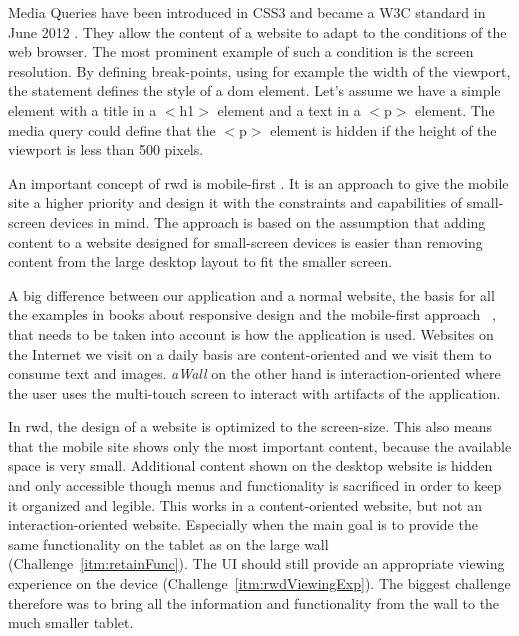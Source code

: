 \documentclass{sigchi}
\begin{document}
Media Queries have been introduced in CSS3 and became a W3C standard in June 2012 \cite{mediaqueriesW3C}.
They allow the content of a website to adapt to the conditions of the web browser.
The most prominent example of such a condition is the screen resolution.
By defining break-points, using for example the width of the viewport, the statement defines the style of a \gls{dom} element.
Let's assume we have a simple element with a title in a $<$h1$>$ element and a text in a $<$p$>$ element.
The media query could define that the $<$p$>$ element is hidden if the height of the viewport is less than 500 pixels.

An important concept of \gls{rwd} is mobile-first \cite{Wroblewski:2011}. 
It is an approach to give the mobile site a higher priority and design it with the constraints and capabilities of small-screen devices in mind. 
The approach is based on the assumption that adding content to a website designed for small-screen devices is easier than removing content from the large desktop layout to fit the smaller screen.

A big difference between our application and a normal website, the basis for all the examples in books about responsive design and the mobile-first approach ~\cite{Marcotte:2011,Wroblewski:2011}, that needs to be taken into account is how the application is used.
Websites on the Internet we visit on a daily basis are content-oriented and we visit them to consume text and images.
\textit{aWall} on the other hand is interaction-oriented where the user uses the multi-touch screen to interact with artifacts of the application.

In \gls{rwd}, the design of a website is optimized to the screen-size.
This also means that the mobile site shows only the most important content, because the available space is very small.
Additional content shown on the desktop website is hidden and only accessible though menus and functionality is sacrificed in order to  keep it organized and legible. This works in a content-oriented website, but not an interaction-oriented website.
Especially when the main goal is to provide the same functionality on the tablet as on the large wall (Challenge~\ref{itm:retainFunc}).
The UI should still provide an appropriate viewing experience on the device (Challenge~\ref{itm:rwdViewingExp}).
The biggest challenge therefore was to bring all the information and functionality from the wall to the much smaller tablet.
\end{document}
